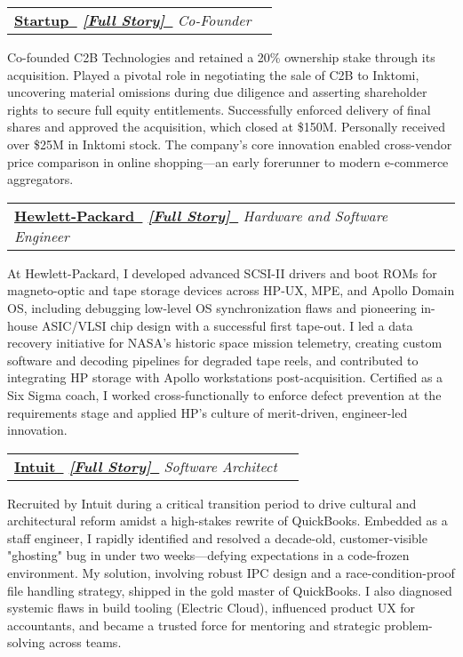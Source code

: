 \documentclass[letterpaper,11pt]{article}
\makeatletter
\newcommand{\resumeItem}[1]{
  \item\small{
    {#1 \vspace{-2pt}}
  }
}
\newcommand{\resumeSubheading}[4]{
  \vspace{-2pt}\item
    \begin{tabular*}{1.0\textwidth}[t]{l@{\extracolsep{\fill}}r}
      \textbf{#1}  \textit{\small#3} & \textbf{\small #2} \\
    \end{tabular*}\vspace{-7pt}
}
\makeatother
\begin{document}
\resumeSubheading
    {\href{https://www.yahoo.com}{Startup~\faExternalLink}
    \quad\small
    \textit{
        \href{https://paul-charlton.vercel.app/story/16}{[Full Story]~{\fontspec{Symbola}\symbol{"1F517}}}}
    }
    {}
    {Co-Founder}
    {Palo Alto, CA}
\resumeItem{
    Co-founded C2B Technologies and retained a 20\% ownership stake through its acquisition. Played a pivotal role in negotiating the sale of C2B to Inktomi, uncovering material omissions during due diligence and asserting shareholder rights to secure full equity entitlements. Successfully enforced delivery of final shares and approved the acquisition, which closed at \$150M. Personally received over \$25M in Inktomi stock. The company’s core innovation enabled cross-vendor price comparison in online shopping—an early forerunner to modern e-commerce aggregators.
}




\resumeSubheading
    {\href{https://www.hp.com}{Hewlett-Packard~\faExternalLink}
    \quad\small
    \textit{
        \href{https://paul-charlton.vercel.app/story/38}{[Full Story]~{\fontspec{Symbola}\symbol{"1F517}}}}
    }
    {}
    {Hardware and Software Engineer}
    {Greeley, CO}
\resumeItem{
    At Hewlett-Packard, I developed advanced SCSI-II drivers and boot ROMs for magneto-optic and tape storage devices across HP-UX, MPE, and Apollo Domain OS, including debugging low-level OS synchronization flaws and pioneering in-house ASIC/VLSI chip design with a successful first tape-out. I led a data recovery initiative for NASA's historic space mission telemetry, creating custom software and decoding pipelines for degraded tape reels, and contributed to integrating HP storage with Apollo workstations post-acquisition. Certified as a Six Sigma coach, I worked cross-functionally to enforce defect prevention at the requirements stage and applied HP's culture of merit-driven, engineer-led innovation.
}


\resumeSubheading
    {\href{https://www.intuit.com}{Intuit~\faExternalLink}
    \quad\small
    \textit{
        \href{https://paul-charlton.vercel.app/story/3}{[Full Story]~{\fontspec{Symbola}\symbol{"1F517}}}}
    }
    {}
    {Software Architect}
    {Greeley, CO}
\resumeItem{Recruited by Intuit during a critical transition period to drive cultural and architectural reform amidst a high-stakes rewrite of QuickBooks. Embedded as a staff engineer, I rapidly identified and resolved a decade-old, customer-visible "ghosting" bug in under two weeks—defying expectations in a code-frozen environment. My solution, involving robust IPC design and a race-condition-proof file handling strategy, shipped in the gold master of QuickBooks. I also diagnosed systemic flaws in build tooling (Electric Cloud), influenced product UX for accountants, and became a trusted force for mentoring and strategic problem-solving across teams.}
\end{document}
